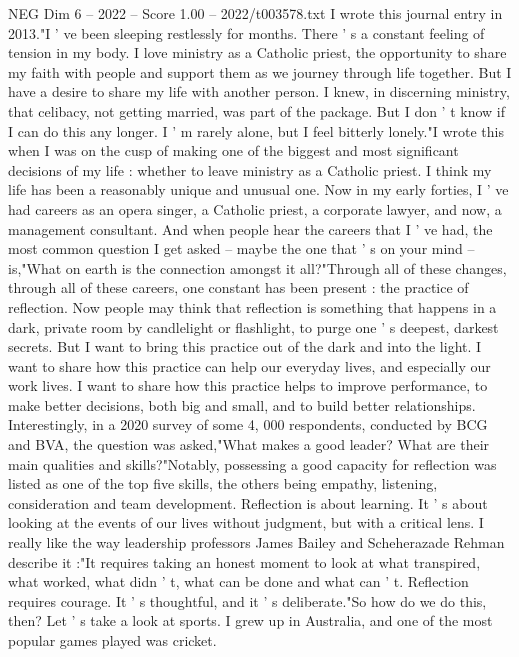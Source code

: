 \begin{textsample}{NEG Dim 6 – 2022 – Score 1.00 – 2022/t003578.txt}  \label{ex:f6_neg_010}
I wrote this journal entry in 2013."I ' ve been sleeping restlessly for months.
There ' s a constant feeling of tension in my body.
I love ministry as a Catholic priest, the opportunity to share my faith with people and support them as we journey through life together.
But I have a desire to share my life with another person.
I knew, in discerning ministry, that celibacy, not getting married, was part of the package.
But I don ' t know if I can do this any longer.
I ' m rarely alone, but I feel bitterly lonely."I wrote this when I was on the cusp of making one of the biggest and most significant decisions of my life : whether to leave ministry as a Catholic priest.
I think my life has been a reasonably unique and unusual one.
Now in my early forties, I ' ve had careers as an opera singer, a Catholic priest, a corporate lawyer, and now, a management consultant.
And when people hear the careers that I ' ve had, the most common question I get asked -- maybe the one that ' s on your mind -- is,"What on earth is the connection amongst it all?"Through all of these changes, through all of these careers, one constant has been present : the practice of reflection.
Now people may think that reflection is something that happens in a dark, private room by candlelight or flashlight, to purge one ' s deepest, darkest secrets.
But I want to bring this practice out of the dark and into the light.
I want to share how this practice can help our everyday lives, and especially our work lives.
I want to share how this practice helps to improve performance, to make better decisions, both big and small, and to build better relationships.
Interestingly, in a 2020 survey of some 4, 000 respondents, conducted by BCG and BVA, the question was asked,"What makes a good leader?
What are their main qualities and skills?"Notably, possessing a good capacity for reflection was listed as one of the top five skills, the others being empathy, listening, consideration and team development.
Reflection is about learning.
It ' s about looking at the events of our lives without judgment, but with a critical lens.
I really like the way leadership professors James Bailey and Scheherazade Rehman describe it :"It requires taking an honest moment to look at what transpired, what worked, what didn ' t, what can be done and what can ' t.
Reflection requires courage.
It ' s thoughtful, and it ' s deliberate."So how do we do this, then?
Let ' s take a look at sports.
I grew up in Australia, and one of the most popular games played was cricket.

\end{textsample}
